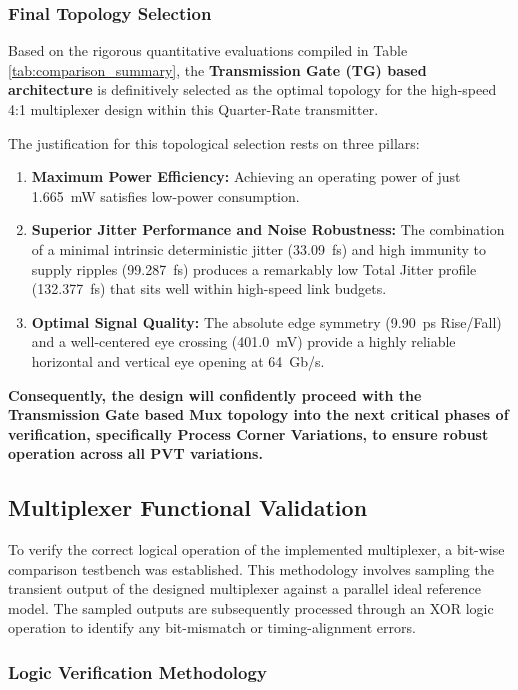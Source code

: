 \subsubsection*{Final Topology Selection}

Based on the rigorous quantitative evaluations compiled in Table \ref{tab:comparison_summary}, the \textbf{Transmission Gate (TG) based architecture} is definitively selected as the optimal topology for the high-speed 4:1 multiplexer design within this Quarter-Rate transmitter. 

The justification for this topological selection rests on three pillars:
\begin{enumerate}
    \item \textbf{Maximum Power Efficiency:} Achieving an operating power of just 1.665~mW satisfies low-power consumption.
    \item \textbf{Superior Jitter Performance and Noise Robustness:} The combination of a minimal intrinsic deterministic jitter (33.09~fs) and high immunity to supply ripples (99.287~fs) produces a remarkably low Total Jitter profile (132.377~fs) that sits well within high-speed link budgets.
    \item \textbf{Optimal Signal Quality:} The absolute edge symmetry (9.90~ps Rise/Fall) and a well-centered eye crossing (401.0~mV) provide a highly reliable horizontal and vertical eye opening at 64~Gb/s.
\end{enumerate}

\textbf{Consequently, the design will confidently proceed with the Transmission Gate based Mux topology into the next critical phases of verification, specifically Process Corner Variations, to ensure robust operation across all PVT variations.}

\subsection{Multiplexer Functional Validation}
\label{subsec:mux_functional_validation}

To verify the correct logical operation of the implemented multiplexer, a bit-wise comparison testbench was established. This methodology involves sampling the transient output of the designed multiplexer against a parallel ideal reference model. The sampled outputs are subsequently processed through an XOR logic operation to identify any bit-mismatch or timing-alignment errors.

\subsubsection*{Logic Verification Methodology}

